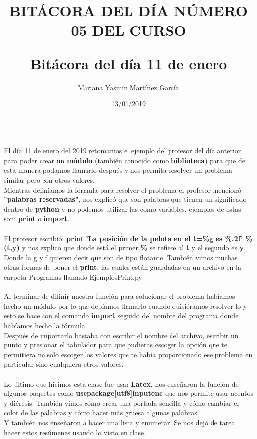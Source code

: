 \documentclass[letterpaper, 12pt, twoside]{article}
\title{\Huge\item\color{red}\textbf {BITÁCORA DEL DÍA NÚMERO 05 DEL CURSO}}
\author{Mariana Yasmin Martínez García}
\date{13/01/2019}
\begin{document}
	\maketitle
	
	\newpage
	\title{\huge\textbf{Bitácora del día 11 de enero\\}} \\
	El día 11 de enero del 2019 retomamos el ejemplo del profesor del día anterior para poder crear un \textbf{módulo} (también conocido como \textbf{biblioteca}) para que de esta manera podamos llamarlo después y nos permita resolver un problema similar pero con otros valores.\\
	Mientras definíamos la fórmula para resolver el problema el profesor  mencionó \textbf{"palabras reservadas"}, nos explicó que son palabras que tienen un significado dentro de \textbf{python} y no podemos utilizar las como variables, ejemplos de estas son: \textbf{print} o \textbf{import}. \\ \\
	El profesor escribió: \textbf{print 'La posición de la pelota en el t=\%g es \%.2f' \% (t,y)}
	y nos explico que donde está el primer \textbf{\%} se refiere al \textbf{t} y el segundo es \textbf{y}. Donde la g y f quieren decir que son de tipo flotante.
	También vimos muchas otras formas de poner el \textbf{print}, las cuales están guardadas en un archivo en la carpeta Programas llamado EjemplosPrint.py \\  \\
	Al terminar de difinir nuestra función para solucionar el problema habíamos hecho un módulo por lo que debíamos llamarlo cuando quisiéramos resolver lo y esto se hace con el comando \textbf{import} seguido del nombre del programa donde habíamos hecho la fórmula. \\
	Después de importarlo bastaba con escribir el nombre del archivo, escribir un punto y presionar el tabulador para que pudieras escoger la opción que te permitiera no solo escoger los valores que te había proporcionado ese problema en particular sino cualquiera otros valores.\\ \\
	Lo último que hicimos esta clase fue usar \textbf{Latex}, nos enseñaron la función de algunos paquetes como \textbf{usepackage[utf8]{inputenc}} que nos permite usar acentos y diéresis. También vimos cómo crear una portada sencilla y cómo cambiar el color de las palabras y cómo hacer más gruesa algunas palabras. \\
	Y también nos enseñaron a hacer una lista  y enumerar.
	Se nos dejó de tarea hacer estos resúmenes usando lo visto en clase.
	
	
\end{document}
